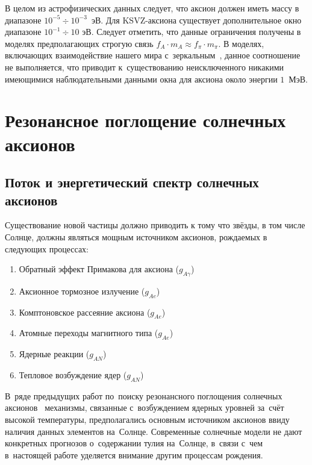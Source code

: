 \documentclass[a4paper,article,14pt]{extarticle}
\begin{document}
В целом из астрофизических данных следует, что аксион должен иметь массу в диапазоне $10^{-5} \div 10^{-3}$~эВ.
Для KSVZ-аксиона существует дополнительное окно диапазоне $10^{-1} \div 10 \text{ эВ}$.
Следует отметить, что данные ограничения получены в моделях предполагающих строгую связь $f_A \cdot m_A \approx f_{\pi} \cdot m_{\pi}$.
В моделях, включающих взаимодействие нашего мира с~зеркальным~\cite{berezhiani2001strong}, данное соотношение не выполняется, что приводит к~существованию неисключенного никакими имеющимися наблюдательными данными окна для аксиона около энергии $1$~МэВ.


\newpage
\section{Резонансное поглощение солнечных аксионов}

\subsection{Поток и энергетический спектр солнечных аксионов}
Существование новой частицы должно приводить к тому что звёзды, в том числе Солнце, должны являться мощным источником аксионов, рождаемых в следующих процессах:
\begin{enumerate}
    \item Обратный эффект Примакова для аксиона ($g_{A\gamma}$)
    \item Аксионное тормозное излучение ($g_{Ae}$)
    \item Комптоновское рассеяние аксиона ($g_{Ae}$)
    \item Атомные переходы магнитного типа ($g_{Ae}$)
    \item Ядерные реакции ($g_{AN}$)
    \item Тепловое возбуждение ядер ($g_{AN}$)
\end{enumerate}
В~ряде предыдущих работ по~поиску резонансного поглощения солнечных аксионов~\cite{prevax57Fe,prevaxLi7,83Kr} механизмы, связанные с~возбуждением ядерных уровней за~счёт высокой температуры, предполагались основным источником аксионов ввиду наличия данных элементов на~Солнце.
Современные солнечные модели не дают конкретных прогнозов о~содержании тулия на~Солнце, в~связи с~чем в~настоящей работе уделяется внимание другим процессам рождения.
\end{document}
